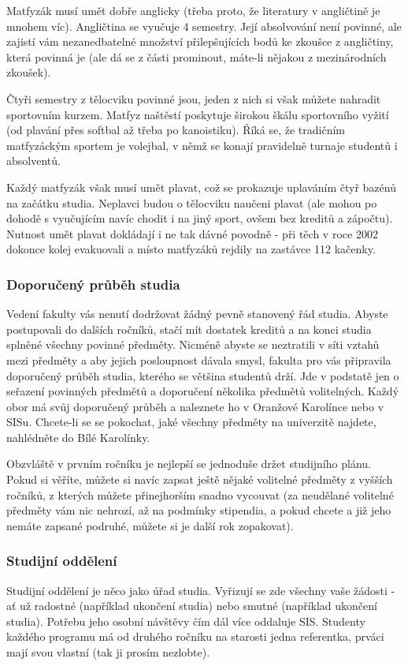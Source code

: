 Matfyzák musí umět dobře anglicky (třeba proto, že literatury v angličtině je mnohem víc). Angličtina se vyučuje 4
semestry. Její absolvování není povinné, ale zajistí vám nezanedbatelné množství přilepšujících bodů ke zkoušce z
angličtiny, která povinná je (ale dá se z části prominout, máte-li nějakou z mezinárodních zkoušek).

Čtyři semestry z tělocviku povinné jsou, jeden z nich si však můžete nahradit sportovním kurzem.
Matfyz naštěstí poskytuje širokou škálu sportovního vyžití (od plavání přes softbal až třeba po kanoistiku). Říká se, že
tradičním matfyzáckým sportem je volejbal, v němž se konají pravidelně turnaje studentů i absolventů.

Každý matfyzák však musí umět plavat, což se prokazuje uplaváním čtyř bazénů na začátku studia. Neplavci budou o
tělocviku naučeni plavat (ale mohou po dohodě s vyučujícím navíc chodit i na jiný sport, ovšem bez kreditů a zápočtu).
Nutnost umět plavat dokládají i ne tak dávné povodně - při těch v roce 2002 dokonce kolej evakuovali a místo matfyzáků
rejdily na zastávce 112 kačenky.


\subsubsection{Doporučený průběh studia}
Vedení fakulty vás nenutí dodržovat žádný pevně stanovený řád studia. Abyste postupovali do dalších ročníků, stačí mít
dostatek kreditů a na konci studia splněné všechny povinné předměty. Nicméně abyste se neztratili v síti vztahů mezi
předměty a aby jejich posloupnost dávala smysl, fakulta pro vás připravila doporučený průběh studia, kterého se většina
studentů drží. Jde v podstatě jen o seřazení povinných předmětů a doporučení několika předmětů volitelných. Každý obor
má svůj doporučený průběh a naleznete ho v Oranžové Karolínce nebo v SISu. Chcete-li se se pokochat, jaké všechny
předměty na univerzitě najdete, nahlédněte do Bílé Karolínky.

Obzvláště v prvním ročníku je nejlepší se jednoduše držet studijního plánu. Pokud si věříte, můžete si navíc zapsat
ještě nějaké volitelné předměty z vyšších ročníků, z kterých můžete přinejhorším snadno vycouvat (za neudělané volitelné
předměty vám nic nehrozí, až na podmínky stipendia, a pokud chcete a již jeho nemáte zapsané podruhé, můžete si je další
rok zopakovat).


\subsubsection{Studijní oddělení}
Studijní oddělení je něco jako úřad studia. Vyřizují se zde všechny vaše žádosti - ať už radostné (například ukončení
studia) nebo smutné (například ukončení studia). Potřebu jeho osobní návštěvy čím dál více oddaluje SIS. Studenty
každého programu má od druhého ročníku na starosti jedna referentka, prváci mají svou vlastní (tak ji prosím nezlobte).

